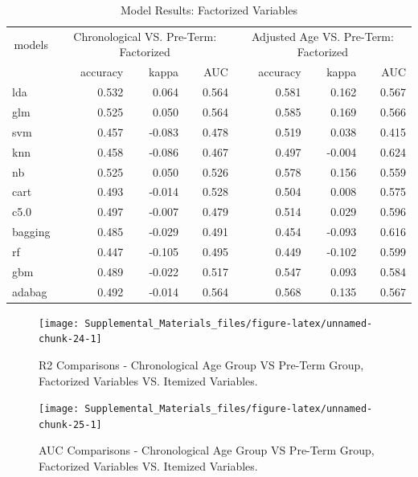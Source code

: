\documentclass[
]{article}
\begin{document}
\begin{table}

\caption{\label{tab:unnamed-chunk-22}Model Results: Factorized Variables}
\fontsize{12}{14}\selectfont
\begin{tabular}[t]{l|r|r|r|r|r|r}
\hline
\multicolumn{1}{c|}{models} & \multicolumn{3}{c|}{Chronological VS. Pre-Term: Factorized} & \multicolumn{3}{c}{Adjusted Age VS. Pre-Term: Factorized} \\
\cline{1-1} \cline{2-4} \cline{5-7}
  & accuracy & kappa & AUC & accuracy & kappa & AUC\\
\hline
lda & 0.532 & 0.064 & 0.564 & 0.581 & 0.162 & 0.567\\
\hline
glm & 0.525 & 0.050 & 0.564 & 0.585 & 0.169 & 0.566\\
\hline
svm & 0.457 & -0.083 & 0.478 & 0.519 & 0.038 & 0.415\\
\hline
knn & 0.458 & -0.086 & 0.467 & 0.497 & -0.004 & 0.624\\
\hline
nb & 0.525 & 0.050 & 0.526 & 0.578 & 0.156 & 0.559\\
\hline
cart & 0.493 & -0.014 & 0.528 & 0.504 & 0.008 & 0.575\\
\hline
c5.0 & 0.497 & -0.007 & 0.479 & 0.514 & 0.029 & 0.596\\
\hline
bagging & 0.485 & -0.029 & 0.491 & 0.454 & -0.093 & 0.616\\
\hline
rf & 0.447 & -0.105 & 0.495 & 0.449 & -0.102 & 0.599\\
\hline
gbm & 0.489 & -0.022 & 0.517 & 0.547 & 0.093 & 0.584\\
\hline
adabag & 0.492 & -0.014 & 0.564 & 0.568 & 0.135 & 0.567\\
\hline
\end{tabular}
\end{table}

\newpage

\begin{figure}

{\centering \texttt{[image: Supplemental\_Materials\_files/figure-latex/unnamed-chunk-24-1]} 

}

\caption{R2 Comparisons - Chronological Age Group VS Pre-Term Group, Factorized Variables VS. Itemized Variables.}\label{fig:unnamed-chunk-24}
\end{figure}

\begin{figure}

{\centering \texttt{[image: Supplemental\_Materials\_files/figure-latex/unnamed-chunk-25-1]} 

}

\caption{AUC Comparisons - Chronological Age Group VS Pre-Term Group, Factorized Variables VS. Itemized Variables.}\label{fig:unnamed-chunk-25}
\end{figure}
\end{document}
